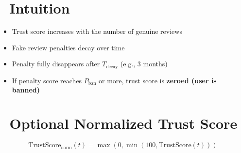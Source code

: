 \documentclass{article}
\begin{document}
\section*{🧠 Intuition}

\begin{itemize}
    \item Trust score increases with the number of genuine reviews
    \item Fake review penalties decay over time
    \item Penalty fully disappears after $T_{\text{decay}}$ (e.g., 3 months)
    \item If penalty score reaches $P_{\text{ban}}$ or more, trust score is \textbf{zeroed (user is banned)}
\end{itemize}

\section*{📘 Optional Normalized Trust Score}

\[
\text{TrustScore}_{\text{norm}}(t) = \max\left(0, \min\left(100, \text{TrustScore}(t)\right)\right)
\]
\end{document}
